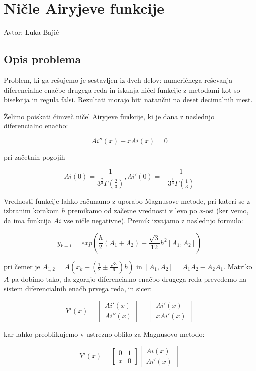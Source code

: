 \documentclass[12pt,a4paper]{article}
\begin{document}
\section{Ničle Airyjeve funkcije}
Avtor: Luka Bajić


\subsection{Opis problema}
Problem, ki ga rešujemo je sestavljen iz dveh delov: numeričnega reševanja diferencialne enačbe drugega reda in iskanja ničel funkcije z metodami kot so bisekcija in regula falsi. Rezultati morajo biti natančni na deset decimalnih mest.


Želimo poiskati čimveč ničel Airyjeve funkcije, ki je dana z naslednjo diferencialno enačbo:


\[
Ai''(x)-xAi(x)=0
\]

pri začetnih pogojih


\[
Ai(0) = \frac{1}{3^{\frac{2}{3}}\Gamma(\frac{2}{3})}, Ai'(0) = -\frac{1}{3^{\frac{1}{3}}\Gamma(\frac{1}{3})}
\]

Vrednosti funkcije lahko računamo z uporabo Magnusove metode, pri kateri se z izbranim korakom $h$ premikamo od začetne vrednosti v levo po $x$-osi (ker vemo, da ima funkcija $Ai$ vse ničle negativne). Premik izvajamo z naslednjo formulo:


\[
y_{k+1} = exp(\frac{h}{2}(A_1+A_2)-\frac{\sqrt{3}}{12}h^2[A_1,A_2])
\]

pri čemer je $A_{1,2}=A(x_k+(\frac{1}{2}\pm \frac{\sqrt{3}}{6})h)$ in $[A_1,A_2] = A_1A_2-A_2A_1$.  Matriko $A$ pa dobimo tako, da zgornjo diferencialno enačbo drugega reda prevedemo na sistem diferencialnih enačb prvega reda, in sicer: 


\[
Y'(x)=\begin{bmatrix}Ai'(x) \\ Ai''(x)\end{bmatrix} = \begin{bmatrix}Ai'(x) \\ xAi'(x)\end{bmatrix}
\]

kar lahko preoblikujemo v ustrezno obliko za Magnusovo metodo:


\[
Y'(x) = \begin{bmatrix}0 & 1 \\ x & 0\end{bmatrix}\begin{bmatrix}Ai(x) \\ Ai'(x)\end{bmatrix}
\]
\end{document}
